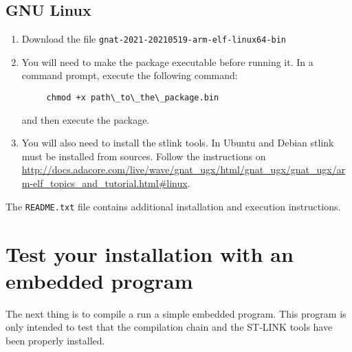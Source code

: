 \subsection{GNU Linux}
\begin{enumerate}
\item Download the file {\tt gnat-2021-20210519-arm-elf-linux64-bin}
\item You will need to make the package executable before running it. In a command prompt, execute the following command:
\begin{verbatim}
     chmod +x path\_to\_the\_package.bin
\end{verbatim}
and then execute the package.
\item You will also need to install the stlink tools. In Ubuntu and Debian stlink must be installed from sources. Follow the instructions on \url{http://docs.adacore.com/live/wave/gnat\_ugx/html/gnat\_ugx/gnat\_ugx/arm-elf\_topics\_and\_tutorial.html\#linux}.
\end{enumerate}

The {\tt README.txt} file contains additional installation and execution instructions.

\section{Test your installation with an embedded program}

The next thing is to compile a run a simple embedded program. This program is only intended to test that the compilation chain and the ST-LINK tools have been properly installed.

